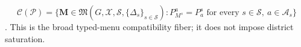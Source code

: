 \[
\mathcal C(\mathcal P)=\{\mathbf M\in\mathfrak M(G,\mathcal X,\mathcal S,\{\Delta_s\}_{s\in\mathcal S}):P_{M^s}^{a}=P_a^s\text{ for every }s\in\mathcal S,\ a\in\mathcal A_s\}
\].
This is the broad typed-menu compatibility fiber; it does not impose district saturation.